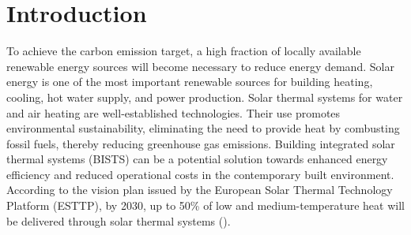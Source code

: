 \chapter{Introduction}
\label{Cap:Int}


To achieve the carbon emission target, a high fraction of locally available renewable
energy sources will become necessary to reduce energy demand. Solar energy is one of
the most important renewable sources for building heating, cooling, hot water
supply, and power production. Solar thermal systems for water and air heating are
well-established technologies. Their use promotes environmental sustainability, eliminating the need to provide heat by combusting fossil fuels, thereby reducing greenhouse gas emissions. Building integrated solar thermal systems (BISTS)
can be a potential solution towards enhanced energy efficiency and reduced operational
costs in the contemporary built environment. According to the vision plan issued by the
European Solar Thermal Technology Platform (ESTTP), by 2030, up to 50\% of low and
medium-temperature heat will be delivered through solar thermal systems (\cite{ESTTP2009}).


